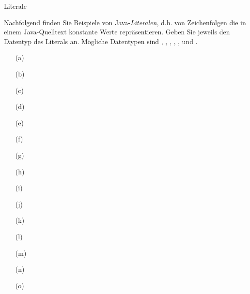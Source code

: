 \begin{frame}[t]%
\medskip

\begin{exercise}{Literale}

\begin{body}
Nachfolgend finden Sie Beispiele von Java-\emph{Literalen}, d.h. von Zeichenfolgen die in einem Java-Quelltext konstante Werte repr\"asentieren.
Geben Sie jeweils den Datentyp des Literals an.
M\"ogliche Datentypen sind , , , , ,  und .
\begin{center}
\begin{minipage}{0.3\textwidth}
\begin{itemize}
\item[(a)] 
\item[(b)] 
\item[(c)] 
\item[(d)] 
\item[(e)] 
\end{itemize}
\end{minipage}
\begin{minipage}{0.3\textwidth}
\begin{itemize}
\item[(f)] 
\item[(g)] 
\item[(h)] 
\item[(i)] 
\item[(j)] 
\end{itemize}
\end{minipage}
\begin{minipage}{0.3\textwidth}
\begin{itemize}
\item[(k)] 
\item[(l)] 
\item[(m)] 
\item[(n)] 
\item[(o)] 
\end{itemize}
\end{minipage}
\end{center}
\end{body}


\end{exercise}
\end{frame}
